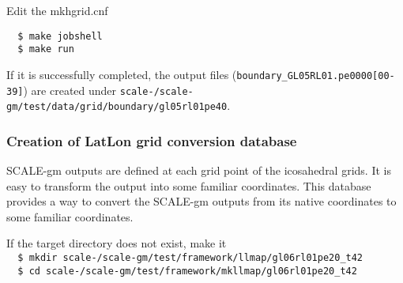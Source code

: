 Edit the mkhgrid.cnf

\vspace{-4mm}
\begin{verbatim}
  $ make jobshell
  $ make run
\end{verbatim}
If it is successfully completed, the output files ({\verb|boundary_GL05RL01.pe0000[00-39]|}) are
created under \verb|scale-|{\version}\verb|/scale-gm/test/data/grid/boundary/gl05rl01pe40|.


\subsubsection{Creation of LatLon grid conversion database}
SCALE-gm outputs are defined at each grid point of the icosahedral grids.
It is easy to transform the output into some familiar coordinates. 
This database provides a way to convert the SCALE-gm outputs from its native 
coordinates to some familiar coordinates.  

If the target directory does not exist, make it \\
\verb|  $ mkdir scale-|{\version}\verb|/scale-gm/test/framework/llmap/gl06rl01pe20_t42| \\
\verb|  $ cd scale-|{\version}\verb|/scale-gm/test/framework/mkllmap/gl06rl01pe20_t42|  \\

